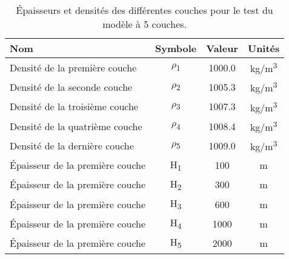\documentclass[10pt]{article}
\numberwithin{equation}{section}
\begin{document}
\begin{table}[htbp]
\caption{\label{tab:org120260f}Épaisseurs et densités des différentes couches pour le test du modèle à 5 couches.}
\centering
\begin{tabular}{lccc}
Nom & Symbole & Valeur & Unités\\[0pt]
\hline
\hline
Densité de la première couche & \(\rho\)\textsubscript{1} & 1000.0 & kg/m\textsuperscript{3}\\[0pt]
Densité de la seconde couche & \(\rho\)\textsubscript{2} & 1005.3 & kg/m\textsuperscript{3}\\[0pt]
Densité de la troisième couche & \(\rho\)\textsubscript{3} & 1007.3 & kg/m\textsuperscript{3}\\[0pt]
Densité de la quatrième couche & \(\rho\)\textsubscript{4} & 1008.4 & kg/m\textsuperscript{3}\\[0pt]
Densité de la dernière couche & \(\rho\)\textsubscript{5} & 1009.0 & kg/m\textsuperscript{3}\\[0pt]
\hline
Épaisseur de la première couche & H\textsubscript{1} & 100 & m\\[0pt]
Épaisseur de la première couche & H\textsubscript{2} & 300 & m\\[0pt]
Épaisseur de la première couche & H\textsubscript{3} & 600 & m\\[0pt]
Épaisseur de la première couche & H\textsubscript{4} & 1000 & m\\[0pt]
Épaisseur de la première couche & H\textsubscript{5} & 2000 & m\\[0pt]
\hline
\hline
\end{tabular}
\end{table}
\end{document}
